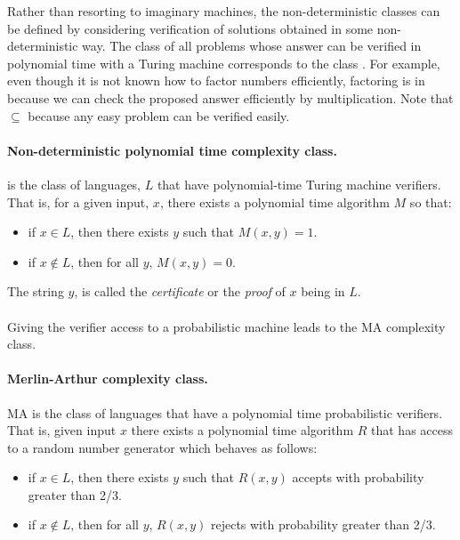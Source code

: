 \documentclass[11pt,oneside,final]{huthesis}%
\begin{document}
Rather than resorting to imaginary machines, the non-deterministic classes can be defined by considering verification of solutions obtained in some non-deterministic way. The class of all problems whose answer can be verified in polynomial time with a Turing machine corresponds to the class {\np}. For example, even though it is not known how to factor numbers efficiently, factoring is in {\np} because we can check the proposed answer efficiently by multiplication. Note that {\p} $\subseteq$ {\np} because any easy problem can be verified easily.  

\paragraph{Non-deterministic polynomial time complexity class.} {\np} is the class of languages, $L$ that have polynomial-time Turing machine verifiers. That is, for a  given input, $x$, there exists a polynomial time algorithm $M$ so that: 
	\begin{itemize}
		\item if $x\in L$, then there exists $y$ such that $M(x,y)=1$.
		\item if $x\notin L$, then for all $y$, $M(x,y)=0$.
	\end{itemize}
	The string $y$, is called the \emph{certificate} or the \emph{proof} of $x$ being in $L$.

\paragraph*{}
Giving the verifier access to a probabilistic machine leads to the {MA} complexity class. 

\paragraph{Merlin-Arthur complexity class.} {MA} is the class of languages that have a polynomial time probabilistic verifiers. That is, given input $x$ there exists a polynomial time algorithm $R$ that has access to a random number generator which behaves as follows:
	\begin{itemize}
		\item if $x\in L$, then there exists $y$ such that $R(x,y)$ accepts with probability greater than 2/3. %
		\item if $x\notin L$, then for all $y$, $R(x,y)$ rejects with probability greater than 2/3.
	\end{itemize}
\end{document}
